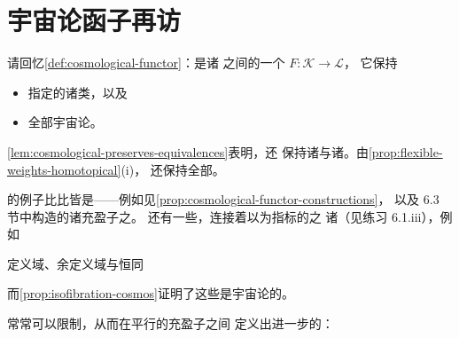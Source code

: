 \providecommand{\rvCorner}[1]{\ulcorner #1\urcorner} %

\section{宇宙论函子再访}\label{sec:cosmological-functors-revisited}

请回忆\cref{def:cosmological-functor}：\textbf{\trCosmologicalFunctor}是诸%
\trInfinityCosmos{}之间的一个\trSimplicialFunctor{} $F\colon\mathcal{K}\to\mathcal{L}$，
它保持
\begin{itemize}
\item 指定的诸\trIsofibration{}类，以及
\item 全部宇宙论\trLimit。
\end{itemize}
\cref{lem:cosmological-preserves-equivalences}表明，\trCosmologicalFunctor{}还%
保持诸\trEquivalence{}与诸\trTrivialFibration{}。由\cref{prop:flexible-weights-homotopical}(i)，
\trCosmologicalFunctor{}还保持全部\trFlexibleWeightedLimit。

\trCosmologicalFunctor{}的例子比比皆是——例如见\cref{prop:cosmological-functor-constructions}，
以及 6.3 节中构造的诸充盈子\trInfinityCosmos{}之\trCosmologicalEmbedding。
还有一些\trCosmologicalFunctor{}，连接着以\trInverseCategory{}为指标的\trFibrant\trDiagram{}之%
诸\trInfinityCosmos{}（见练习 6.1.iii），例如

定义域\trFunctor、余定义域\trFunctor{}与恒同\trFunctor
\begin{center}
\end{center}
而\cref{prop:isofibration-cosmos}证明了这些\trFunctor{}是宇宙论的。

\trCosmologicalFunctor{}常常可以限制，从而在平行的充盈子\trInfinityCosmos{}之间%
定义出进一步的\trCosmologicalFunctor：

